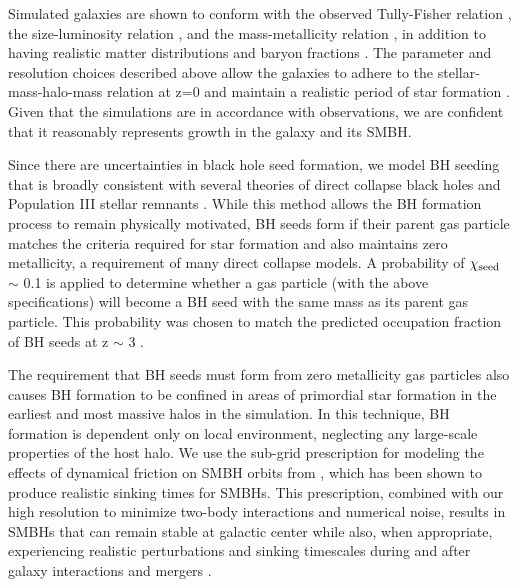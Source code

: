 \documentclass[]{emulateapj}
\begin{document}
Simulated galaxies are shown to conform with the observed Tully-Fisher relation \citep{Governato2009}, the size-luminosity relation \citep{Brooks2011}, and the mass-metallicity relation \citep{Brooks2007,Christensen2015}, in addition to having realistic matter distributions and baryon fractions \citep{Governato2009a,Guedes2011}. The parameter and resolution choices described above allow the galaxies to adhere to the stellar-mass-halo-mass relation at z=0 and maintain a realistic period of star formation \citep{Moster2010,Munshi2013,Brooks2007,Maiolino2008}. Given that the simulations are in accordance with observations, we are confident that it reasonably represents growth in the galaxy and its SMBH.
 
Since there are uncertainties in black hole seed formation, we model BH seeding that is broadly consistent with several theories of direct collapse black holes \citep{Couchman1986, Abel2002, Bromm2004} and Population III stellar remnants \citep{Loeb1994, Eisenstein1995, Koushiappas2004, Begelman2006, Lodato2006}. While this method allows the BH formation process to remain physically motivated, BH seeds form if their parent gas particle matches the criteria required for star formation and also maintains zero metallicity, a requirement of many direct collapse models. A probability of $\chi_{\rm seed}$ $\sim$ 0.1 is applied to determine whether a gas particle (with the above specifications) will become a BH seed with the same mass as its parent gas particle. This probability was chosen to match the predicted occupation fraction of BH seeds at z $\sim$ 3 \citep{Volonteri2008}.

The requirement that BH seeds must form from zero metallicity gas particles also causes BH formation to be confined in areas of primordial star formation in the earliest and most massive halos in the simulation. In this technique, BH formation is dependent only on local environment, neglecting any large-scale properties of the host halo. We use the sub-grid prescription for modeling the effects of dynamical friction on SMBH orbits from \cite{Tremmel2015}, which has been shown to produce realistic sinking times for SMBHs.  This prescription, combined with our high resolution to minimize two-body interactions and numerical noise, results in SMBHs that can remain stable at galactic center while also, when appropriate, experiencing realistic perturbations and sinking timescales during and after galaxy interactions and mergers \citep{Bellovary2011}.
\end{document}
